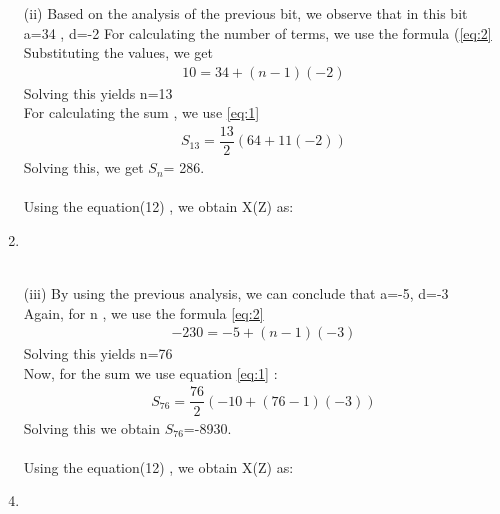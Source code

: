 \documentclass[journal,12pt,twocolumn]{IEEEtran}
\theoremstyle{remark}
\begin{document}
\begin{enumerate}
\item[(ii)]
\vspace{0.5cm}
Based on the analysis of the previous bit, we observe that in this bit \\ a=34 , d=-2
For calculating the number of terms, we use the formula (\eqref{eq:2}\\
Substituting the values, we get
\begin{align}
     10 = 34 + (n-1)(-2)
     \end{align}
Solving this yields n=13\\
For calculating the sum , we use \eqref{eq:1}
\begin{align}
 S_{13} = \dfrac{13}{2}(64+11(-2))
 \end{align}
 Solving this, we get $S_n$= 286.\\\\
 Using the equation(12) , we obtain X(Z) as:
  \item {} \\\\

\item[(iii)]  
\vspace{0.5cm}
By using the previous analysis, we can conclude that a=-5, d=-3\\
Again, for n , we use the formula \eqref{eq:2}
\begin{align}
-230= -5+(n-1)(-3)
\end{align}
Solving this yields n=76\\
Now, for the sum we use equation \eqref{eq:1} :\\
\begin{align}
    S_{76}=\dfrac{76}{2}(-10+(76-1)(-3))
    \end{align}
Solving this we obtain $S_{76}$=-8930.\\\\
 Using the equation(12) , we obtain X(Z) as:
 \item {}\\


 






\end{enumerate}



 

 
\end{document}
